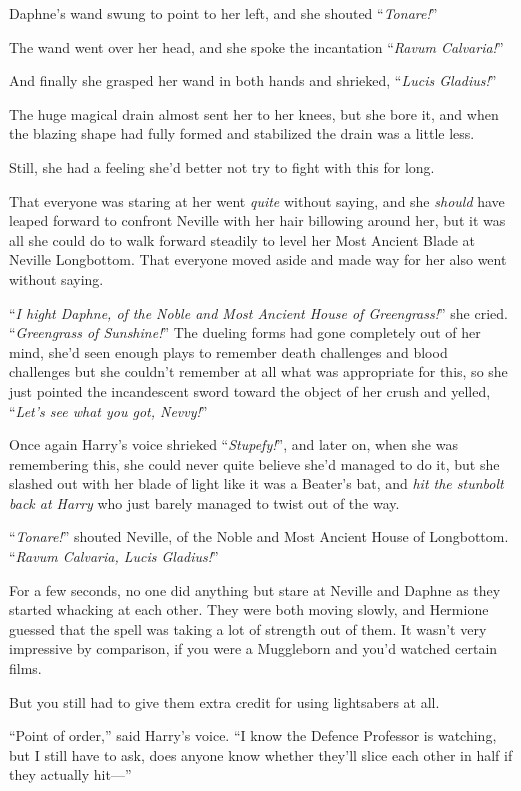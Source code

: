 Daphne’s wand swung to point to her left, and she shouted “\emph{Tonare!}”

The wand went over her head, and she spoke the incantation “\emph{Ravum Calvaria!}”

And finally she grasped her wand in both hands and shrieked, “\emph{Lucis Gladius!}”

The huge magical drain almost sent her to her knees, but she bore it, and when the blazing shape had fully formed and stabilized the drain was a little less.

Still, she had a feeling she’d better not try to fight with this for long.

That everyone was staring at her went \emph{quite} without saying, and she \emph{should} have leaped forward to confront Neville with her hair billowing around her, but it was all she could do to walk forward steadily to level her Most Ancient Blade at Neville Longbottom. That everyone moved aside and made way for her also went without saying.

“\emph{I hight Daphne, of the Noble and Most Ancient House of Greengrass!}” she cried. “\emph{Greengrass of Sunshine!}” The dueling forms had gone completely out of her mind, she’d seen enough plays to remember death challenges and blood challenges but she couldn’t remember at all what was appropriate for this, so she just pointed the incandescent sword toward the object of her crush and yelled, “\emph{Let’s see what you got, Nevvy!}”

Once again Harry’s voice shrieked “\emph{Stupefy!}”, and later on, when she was remembering this, she could never quite believe she’d managed to do it, but she slashed out with her blade of light like it was a Beater’s bat, and \emph{hit the stunbolt back at Harry} who just barely managed to twist out of the way.

“\emph{Tonare!}” shouted Neville, of the Noble and Most Ancient House of Longbottom. “\emph{Ravum Calvaria, Lucis Gladius!}”

\later

For a few seconds, no one did anything but stare at Neville and Daphne as they started whacking at each other. They were both moving slowly, and Hermione guessed that the spell was taking a lot of strength out of them. It wasn’t very impressive by comparison, if you were a Muggleborn and you’d watched certain films.

But you still had to give them extra credit for using lightsabers at all.

“Point of order,” said Harry’s voice. “I know the Defence Professor is watching, but I still have to ask, does anyone know whether they’ll slice each other in half if they actually hit—”

